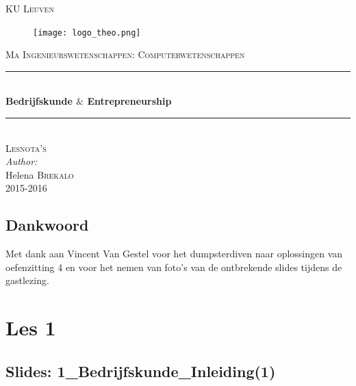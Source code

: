 \documentclass[10pt,a4paper]{report}
\author{Helena Brekalo}
\begin{document}
\begin{titlepage}

\newcommand{\HRule}{\rule{\linewidth}{0.5mm}} %

\center %
 
\textsc{\LARGE KU Leuven}\\[1.5cm] %

\begin{figure}[ht!]
\centering
\texttt{[image: logo\_theo.png]}
\label{kulogo}
\end{figure}

\textsc{\Large Ma Ingenieurswetenschappen: Computerwetenschappen}\\[0.5cm] %


\HRule \\[0.4cm]
{ \huge \bfseries Bedrijfskunde $\&$ Entrepreneurship}\\[0.4cm]
\HRule \\[1.5cm]


\textsc{\Large Lesnota's}\\[0.5cm] %


\large \emph{Author:}\\
Helena \textsc{Brekalo}\\[3cm]

{\large 2015-2016}\\[3cm] %

\vfill %

\end{titlepage}

\tableofcontents
\clearpage

\section{Dankwoord}
Met dank aan Vincent Van Gestel voor het dumpsterdiven naar oplossingen van oefenzitting 4 en voor het nemen van foto's van de ontbrekende slides tijdens de gastlezing.

\chapter{Les 1}

\section{Slides: 1\_Bedrijfskunde\_Inleiding(1)}
\end{document}
